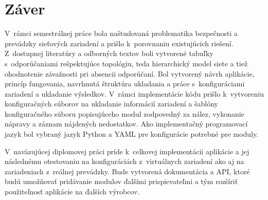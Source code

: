 \chapter*{Záver}
{}

V~rámci semestrálnej práce bola naštudovaná problematika bezpečnosti a prevádzky sieťových zariadení a prišlo k~porovnaniu existujúcich riešení. Z~dostupnej literatúry a odborných textov boli vytvorené tabuľky s~odporúčaniami rešpektujúce topológiu, teda hierarchický model siete a tiež ohodnotenie závažnosti pri absencii odporúčaní. Bol vytvorený návrh aplikácie, princíp fungovania, navrhnutá štruktúra ukladania a práce s~konfiguráciami zariadení a ukladanie výsledkov. V~rámci implementácie kódu prišlo k~vytvoreniu konfiguračných súborov na ukladanie informácií zariadení a šablóny konfiguračného súboru popisujúceho modul zodpovedný za nález, vykonanie nápravy a záznam nájdených nedostatkov. Ako implementačný programovací jazyk bol vybraný jazyk Python a YAML pre konfigurácie potrebné pre moduly.

V~naväzujúcej diplomovej práci príde k~celkovej implementácii aplikácie a jej následnému otestovaniu na konfiguráciách z~virtuálnych zariadení ako aj na zariadeniach z~reálnej prevádzky. Bude vytvorená dokumentácia a API, ktoré budú umožňovať pridávanie modulov ďalšími prispievateľmi a tým rozšíriť použiteľnosť aplikácie na ďalších výrobcov. 
